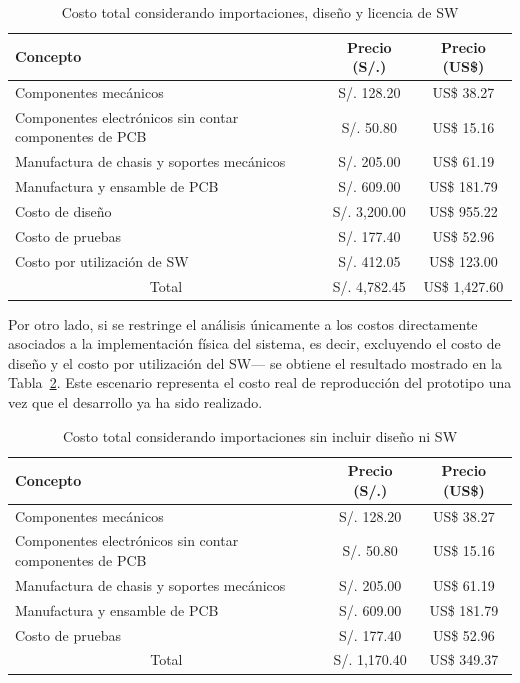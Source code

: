 \begin{table}[H]
\centering
\caption{Costo total considerando importaciones, diseño y licencia de \ac{SW}}
\label{tab:total_importado_completo}

\vspace{0.5em}

\begin{tabular}{|p{7cm}||c|c|}
\hline
Concepto & Precio (S/.) & Precio (US\$) \\
\hline
Componentes mecánicos 
& S/. 128.20 
& US\$ 38.27 \\
\hline
Componentes electrónicos sin contar componentes de \ac{PCB} 
& S/. 50.80 
& US\$ 15.16 \\
\hline
Manufactura de chasis y soportes mecánicos 
& S/. 205.00 
& US\$ 61.19 \\
\hline
Manufactura y ensamble de \ac{PCB} 
& S/. 609.00 
& US\$ 181.79 \\
\hline
Costo de diseño 
& S/. 3,200.00 
& US\$ 955.22 \\
\hline
Costo de pruebas 
& S/. 177.40 
& US\$ 52.96 \\
\hline
Costo por utilización de \ac{SW} 
& S/. 412.05 
& US\$ 123.00 \\
\hline
\multicolumn{1}{|c||}{Total} 
& S/. 4,782.45 
& US\$ 1,427.60 \\
\hline
\end{tabular}
\end{table}

\noindent
Por otro lado, si se restringe el análisis únicamente a los costos directamente asociados a la implementación física del sistema, es decir, excluyendo el costo de diseño y el costo por utilización del \ac{SW}— se obtiene el resultado mostrado en la Tabla~\ref{tab:total_importado_sin_diseno}. Este escenario representa el costo real de reproducción del prototipo una vez que el desarrollo ya ha sido realizado.

\begin{table}[H]
\centering
\caption{Costo total considerando importaciones sin incluir diseño ni \ac{SW}}
\label{tab:total_importado_sin_diseno}

\vspace{0.5em}

\begin{tabular}{|p{7cm}||c|c|}
\hline
Concepto & Precio (S/.) & Precio (US\$) \\
\hline
Componentes mecánicos 
& S/. 128.20 
& US\$ 38.27 \\
\hline
Componentes electrónicos sin contar componentes de \ac{PCB} 
& S/. 50.80 
& US\$ 15.16 \\
\hline
Manufactura de chasis y soportes mecánicos 
& S/. 205.00 
& US\$ 61.19 \\
\hline
Manufactura y ensamble de \ac{PCB} 
& S/. 609.00 
& US\$ 181.79 \\
\hline
Costo de pruebas 
& S/. 177.40 
& US\$ 52.96 \\
\hline
\multicolumn{1}{|c||}{Total} 
& S/. 1,170.40 
& US\$ 349.37 \\
\hline
\end{tabular}
\end{table}

